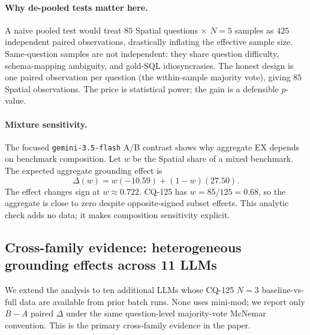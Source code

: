 \paragraph{Why de-pooled tests matter here.} A naive pooled test would treat $85$ Spatial questions $\times$ $N{=}5$ samples as $425$ independent paired observations, drastically inflating the effective sample size. Same-question samples are not independent: they share question difficulty, schema-mapping ambiguity, and gold-SQL idiosyncrasies. The honest design is one paired observation per question (the within-sample majority vote), giving $85$ Spatial observations. The price is statistical power; the gain is a defensible $p$-value.

\paragraph{Mixture sensitivity.} The focused \texttt{gemini-3.5-flash} A/B contrast shows why aggregate EX depends on benchmark composition. Let $w$ be the Spatial share of a mixed benchmark. The expected aggregate grounding effect is
\[
\Delta(w) = w(-10.59) + (1-w)(27.50).
\]
The effect changes sign at $w \approx 0.722$. CQ-125 has $w=85/125=0.68$, so the aggregate is close to zero despite opposite-signed subset effects. This analytic check adds no data; it makes composition sensitivity explicit.

\subsection{Cross-family evidence: heterogeneous grounding effects across 11 LLMs}
\label{sec:gisr:cross-family}

We extend the analysis to ten additional LLMs whose CQ-125 $N{=}3$ baseline-vs-full data are available from prior batch runs. None uses mini-mod; we report only $B - A$ paired $\Delta$ under the same question-level majority-vote McNemar convention. This is the primary cross-family evidence in the paper.

